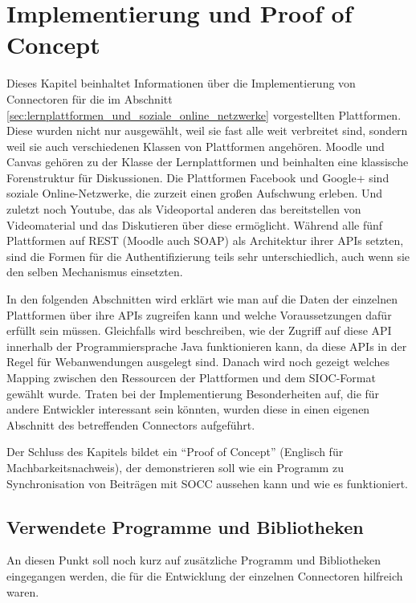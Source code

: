 
\chapter{Implementierung und Proof of Concept} %
\label{cha:implementierung_und_evaluation}

Dieses Kapitel beinhaltet Informationen über die Implementierung von Connectoren für die im Abschnitt \ref{sec:lernplattformen_und_soziale_online_netzwerke} vorgestellten Plattformen. Diese wurden nicht nur ausgewählt, weil sie fast alle weit verbreitet sind, sondern weil sie auch verschiedenen Klassen von Plattformen angehören. Moodle und Canvas gehören zu der Klasse der Lernplattformen und beinhalten eine klassische Forenstruktur für Diskussionen. Die Plattformen Facebook und Google+ sind soziale Online-Netzwerke, die zurzeit einen großen Aufschwung erleben. Und zuletzt noch Youtube, das als Videoportal anderen das bereitstellen von Videomaterial und das Diskutieren über diese ermöglicht. Während alle fünf Plattformen auf REST (Moodle auch SOAP) als Architektur ihrer APIs setzten, sind die Formen für die Authentifizierung teils sehr unterschiedlich, auch wenn sie den selben Mechanismus einsetzten.

In den folgenden Abschnitten wird erklärt wie man auf die Daten der einzelnen Plattformen über ihre APIs zugreifen kann und welche Voraussetzungen dafür erfüllt sein müssen. Gleichfalls wird beschreiben, wie der Zugriff auf diese API innerhalb der Programmiersprache Java funktionieren kann, da diese APIs in der Regel für Webanwendungen ausgelegt sind. Danach wird noch gezeigt welches Mapping zwischen den Ressourcen der Plattformen und dem SIOC-Format gewählt wurde. Traten bei der Implementierung Besonderheiten auf, die für andere Entwickler interessant sein könnten, wurden diese in einen eigenen Abschnitt des betreffenden Connectors aufgeführt.

Der Schluss des Kapitels bildet ein \enquote{Proof of Concept} (Englisch für Machbarkeitsnachweis), der demonstrieren soll wie ein Programm zu Synchronisation von Beiträgen mit SOCC aussehen kann und wie es funktioniert.

\section{Verwendete Programme und Bibliotheken} %
\label{sec:verwendete_bibliotheken_und_programme}

An diesen Punkt soll noch kurz auf zusätzliche Programm und Bibliotheken eingegangen werden, die für die Entwicklung der einzelnen Connectoren hilfreich waren. 

